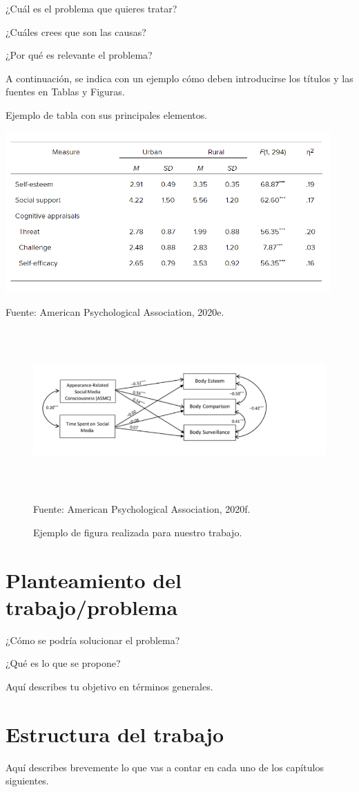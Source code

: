 ¿Cuál es el problema que quieres tratar?

¿Cuáles crees que son las causas?

¿Por qué es relevante el problema?

A continuación, se indica con un ejemplo cómo deben introducirse los títulos y las fuentes en Tablas y Figuras.

\begin{table}[t]
	\begin{center}
	\caption{Ejemplo de tabla con sus principales elementos.}
	\label{tab:tab-1}
	\includegraphics[width=4.90737in,height=2.42708in]{tabla}

	\small Fuente: American Psychological Association, 2020e.
	\end{center}
\end{table}

\begin{figure}[ht]
	\begin{center}
		\caption{Ejemplo de figura realizada para nuestro trabajo.}
		\label{fig:fig-1}
		\includegraphics[width=4.90737in,height=2.42708in]{figura}

		\small Fuente: American Psychological Association, 2020f.
	\end{center}
\end{figure}

\section{Planteamiento del trabajo/problema}

¿Cómo se podría solucionar el problema?

¿Qué es lo que se propone?

Aquí describes tu objetivo en términos generales.

\section{Estructura del trabajo}

Aquí describes brevemente lo que vas a contar en cada uno de los capítulos siguientes.
